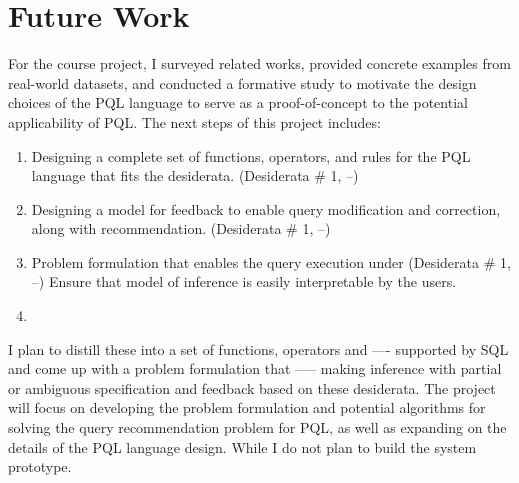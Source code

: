 \documentclass{sig-alternate-05-2015}
\begin{document}
\section{Future Work}
For the course project, I surveyed related works, provided concrete examples from real-world datasets, and conducted a formative study to motivate the design choices of the PQL language to serve as a proof-of-concept to the potential applicability of PQL. The next steps of this project includes: 
\begin{enumerate}
\item Designing a complete set of functions, operators, and rules for the PQL language that fits the desiderata. (Desiderata \# 1, --)
\item Designing a model for feedback to enable query modification and correction, along with recommendation. (Desiderata \# 1, --)
\item Problem formulation that enables the query execution under (Desiderata \# 1, --)
Ensure that model of inference is easily interpretable by the users.
\item 
\end{enumerate}
I plan to distill these into a set of functions, operators and ---- supported by SQL and come up with a problem formulation that ----- making inference with partial or ambiguous specification and feedback based on these desiderata.
The project will focus on developing the problem formulation and potential algorithms for solving the query recommendation problem for PQL, as well as expanding on the details of the PQL language design. While I do not plan to build the system prototype.

  
\end{document}

